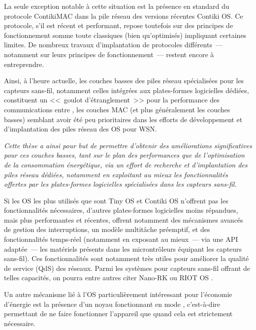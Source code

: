 La seule exception notable à cette situation est la présence en standard
du protocole ContikiMAC \cite{ContikiMAC} dans la pile réseau des versions
récentes Contiki OS. Ce protocole, s'il est récent et performant, repose
toutefois sur des principes de fonctionnement somme toute classiques
(bien qu'optimisés) impliquant certaines limites. De nombreux travaux
d'implantation de protocoles différents~--- notamment sur leurs principes
de fonctionnement~--- restent encore à entreprendre.

Ainsi, à l'heure actuelle, les couches basses des piles réseau spécialisées
pour les capteurs sans-fil, notamment celles intégrées aux plates-formes
logicielles dédiées, constituent un <<~goulot d'étranglement~>> pour la
performance des communications entre , les couches MAC (et
plus généralement les couches basses) semblant avoir été peu prioritaires
dans les efforts de développement et d'implantation des piles réseau
des OS pour WSN.

\medskip

\emph{Cette thèse a ainsi pour but de permettre d'obtenir des améliorations
significatives pour ces couches basses, tant sur le plan des performances
que de l'optimisation de la consommation énergétique, via un effort de
recherche et d'implantation des piles réseau dédiées, notamment en exploitant
au mieux les fonctionnalités offertes par les plates-formes logicielles
spécialisées dans les capteurs sans-fil.}

Si les OS les plus utilisés que sont Tiny OS \cite{TinyOS} et Contiki OS
\cite{ContikiOS} n'offrent pas les fonctionnalités nécessaires, d'autres
plates-formes logicielles moins répandues, mais plus performantes et récentes,
offrent notamment des mécanismes avancés de gestion des interruptions,
un modèle multitâche préemptif, et des fonctionnalités temps-réel (notamment
en exposant au mieux~--- via une API adaptée~--- les  matériels
présents dans les microntrôleurs équipant les capteurs sans-fil).
Ces fonctionnalités sont notamment très utiles pour améliorer la qualité
de service (QdS) des réseaux. Parmi les systèmes pour capteurs sans-fil
offrant de telles capacités, on pourra entre autres citer Nano-RK
\cite{NanoRK} ou RIOT OS \cite{RIOT}.

Un autre mécanisme lié à l'OS particulièrement intéressant pour l'économie
d'énergie est la présence d'un noyau fonctionnant en mode ,
c'est-à-dire permettant de ne faire fonctionner l'appareil que quand cela
est strictement nécessaire. 

